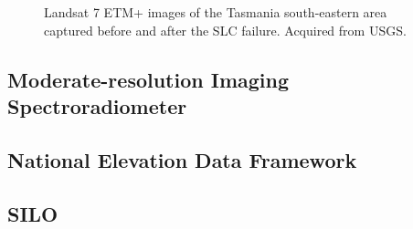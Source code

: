 \begin{figure}[hbt]
\myfloatalign
{} \quad
{}
\caption{Landsat 7 ETM+ images of the Tasmania south-eastern area captured before and after the SLC failure. Acquired from USGS.}
\label{fig:l7slc}
\end{figure}

\subsection{Moderate-resolution Imaging Spectroradiometer}

\subsection{National Elevation Data Framework}

\subsection{SILO}

